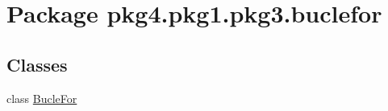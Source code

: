 \hypertarget{namespacepkg4_1_1pkg1_1_1pkg3_1_1buclefor}{}\section{Package pkg4.\+pkg1.\+pkg3.\+buclefor}
\label{namespacepkg4_1_1pkg1_1_1pkg3_1_1buclefor}
\subsection*{Classes}
\begin{DoxyCompactItemize}
\item 
class \mbox{\hyperlink{classpkg4_1_1pkg1_1_1pkg3_1_1buclefor_1_1_bucle_for}{Bucle\+For}}
\end{DoxyCompactItemize}
